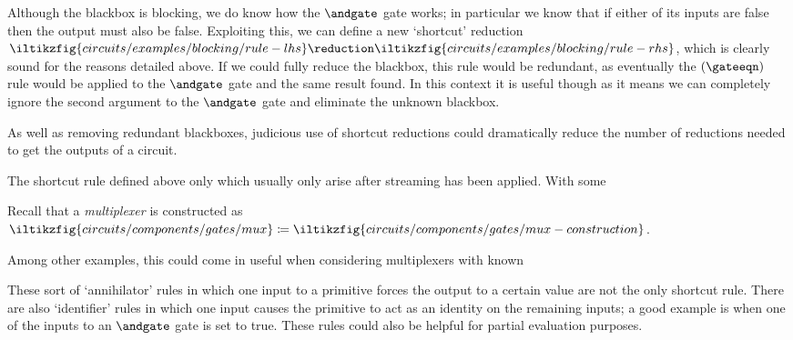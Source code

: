 Although the blackbox is blocking, we do know how the \(\andgate\) gate
works; in particular we know that if either of its inputs are false then
the output must also be false.
Exploiting this, we can define a new `shortcut' reduction
\(
\iltikzfig{circuits/examples/blocking/rule-lhs}
\reduction
\iltikzfig{circuits/examples/blocking/rule-rhs}
\), which is clearly sound for the reasons detailed above.
If we could fully reduce the blackbox, this rule would be redundant, as
eventually the \((\gateeqn)\) rule would be applied to the \(\andgate\)
gate and the same result found.
In this context it is useful though as it means we can completely ignore the
second argument to the \(\andgate\) gate and eliminate the unknown blackbox.



As well as removing redundant blackboxes, judicious use of shortcut
reductions could dramatically reduce the number of reductions needed to
get the outputs of a circuit.

The shortcut rule defined above only
which usually only arise after streaming has been applied.
With some

\begin{example}
    Recall that a \emph{multiplexer} is constructed as \(
    \iltikzfig{circuits/components/gates/mux}
    \coloneqq
    \iltikzfig{circuits/components/gates/mux-construction}
    \).

    Among other examples, this could come in useful when considering
    multiplexers with known
\end{example}

\begin{remark}
    These sort of `annihilator' rules in which one input to a primitive forces
    the output to a certain value are not the only shortcut rule.
    There are also `identifier' rules in which one input causes the primitive to
    act as an identity on the remaining inputs; a good example is when one of
    the inputs to an \(\andgate\) gate is set to true.
    These rules could also be helpful for partial evaluation purposes.
\end{remark}


